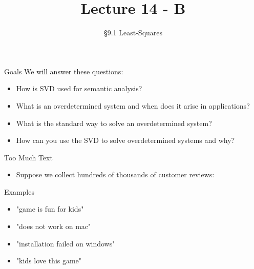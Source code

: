 \documentclass[10pt]{beamer}
\title[Math/CS 375]{Lecture 14 - B}
\subtitle{\S 9.1 Least-Squares}
\begin{document}
\begin{frame}
  \titlepage
\end{frame}

\begin{frame}{Goals}
We will answer these questions:\\[3mm]
\begin{itemize}
    \item How is SVD used for semantic analysis?
    \item What is an overdetermined system and when does it arise in applications?
    \item What is the standard way to solve an overdetermined system?
    \item How can you use the SVD to solve overdetermined systems and why?
\end{itemize}
\end{frame}


\begin{frame}{Too Much Text}

\begin{itemize}
\item Suppose we collect hundreds of thousands of customer reviews:
\end{itemize}

\vspace{2mm}

\begin{block}{Examples}
\begin{itemize}
\item "game is fun for kids"
\item "does not work on mac"
\item "installation failed on windows"
\item "kids love this game"
\end{itemize}
\end{block}

\vspace{3mm}

\pause

\end{frame}
\end{document}
